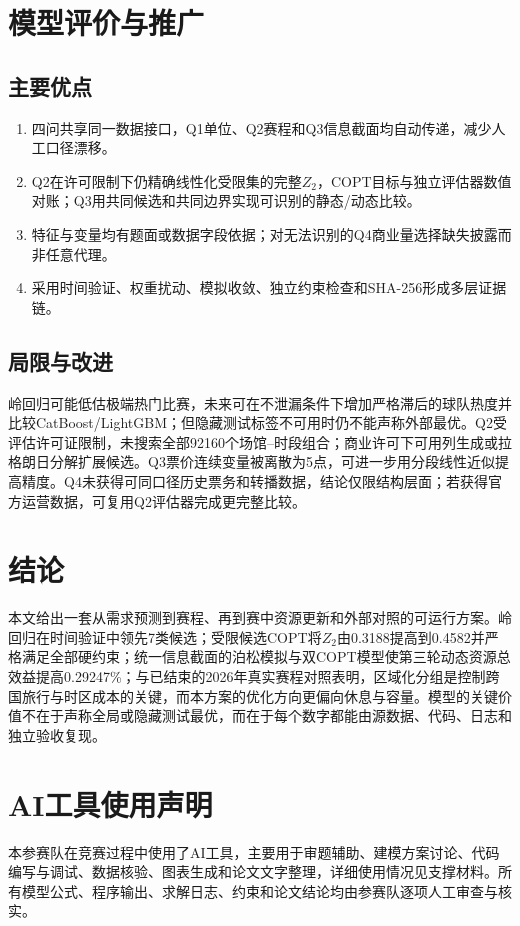 \documentclass[UTF8,a4paper,zihao=-4,fontset=fandol]{ctexart}
\begin{document}
\section{模型评价与推广}
\subsection{主要优点}
\begin{enumerate}
  \item 四问共享同一数据接口，Q1单位、Q2赛程和Q3信息截面均自动传递，减少人工口径漂移。
  \item Q2在许可限制下仍精确线性化受限集的完整$Z_2$，COPT目标与独立评估器数值对账；Q3用共同候选和共同边界实现可识别的静态/动态比较。
  \item 特征与变量均有题面或数据字段依据；对无法识别的Q4商业量选择缺失披露而非任意代理。
  \item 采用时间验证、权重扰动、模拟收敛、独立约束检查和SHA-256形成多层证据链。
\end{enumerate}

\subsection{局限与改进}
岭回归可能低估极端热门比赛，未来可在不泄漏条件下增加严格滞后的球队热度并比较CatBoost/LightGBM；但隐藏测试标签不可用时仍不能声称外部最优。Q2受评估许可证限制，未搜索全部92160个场馆--时段组合；商业许可下可用列生成或拉格朗日分解扩展候选。Q3票价连续变量被离散为5点，可进一步用分段线性近似提高精度。Q4未获得可同口径历史票务和转播数据，结论仅限结构层面；若获得官方运营数据，可复用Q2评估器完成更完整比较。

\section{结论}
本文给出一套从需求预测到赛程、再到赛中资源更新和外部对照的可运行方案。岭回归在时间验证中领先7类候选；受限候选COPT将$Z_2$由0.3188提高到0.4582并严格满足全部硬约束；统一信息截面的泊松模拟与双COPT模型使第三轮动态资源总效益提高0.29247\%；与已结束的2026年真实赛程对照表明，区域化分组是控制跨国旅行与时区成本的关键，而本方案的优化方向更偏向休息与容量。模型的关键价值不在于声称全局或隐藏测试最优，而在于每个数字都能由源数据、代码、日志和独立验收复现。

\section*{AI工具使用声明}
本参赛队在竞赛过程中使用了AI工具，主要用于审题辅助、建模方案讨论、代码编写与调试、数据核验、图表生成和论文文字整理，详细使用情况见支撑材料。所有模型公式、程序输出、求解日志、约束和论文结论均由参赛队逐项人工审查与核实。
\end{document}
